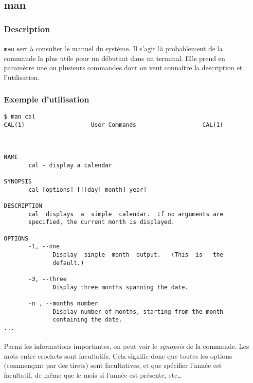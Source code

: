 \subsection{man}

\subsubsection*{Description}

\paragraph{} \texttt{man} sert à consulter le manuel du système. Il s'agit là
probablement de la commande la plus utile pour un débutant dans un terminal.
Elle prend en paramètre une ou plusieurs commandes dont on veut connaître la
description et l'utilisation.

\subsubsection*{Exemple d'utilisation}

\begin{lstlisting}
$ man cal
CAL(1)                   User Commands                   CAL(1)



NAME
       cal - display a calendar

SYNOPSIS
       cal [options] [[[day] month] year]

DESCRIPTION
       cal  displays  a  simple  calendar.  If no arguments are
       specified, the current month is displayed.

OPTIONS
       -1, --one
              Display  single  month  output.   (This  is   the
              default.)

       -3, --three
              Display three months spanning the date.

       -n , --months number
              Display number of months, starting from the month
              containing the date.
...
\end{lstlisting}

\paragraph{} Parmi les informations importantes, on peut voir le
\emph{synopsis} de la commande. Les mots entre crochets sont facultatifs. Cela
signifie donc que toutes les options (commençant par des tirets) sont
facultatives, et que spécifier l'année est facultatif, de même que le mois si
l'année est présente, etc\ldots

